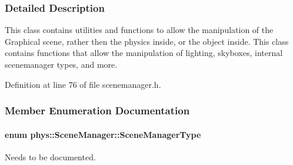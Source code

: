 \subsubsection{Detailed Description}
This class contains utilities and functions to allow the manipulation of the Graphical scene, rather then the physics inside, or the object inside. This class contains functions that allow the manipulation of lighting, skyboxes, internal scenemanager types, and more. 

Definition at line 76 of file scenemanager.h.



\subsubsection{Member Enumeration Documentation}
\hypertarget{classphys_1_1SceneManager_a14fe15dcf41564fdf12f3e11c1a4b774}{
\paragraph[{SceneManagerType}]{\setlength{\rightskip}{0pt plus 5cm}enum {\bf phys::SceneManager::SceneManagerType}}\hfill}
\label{classphys_1_1SceneManager_a14fe15dcf41564fdf12f3e11c1a4b774}


Needs to be documented. 

